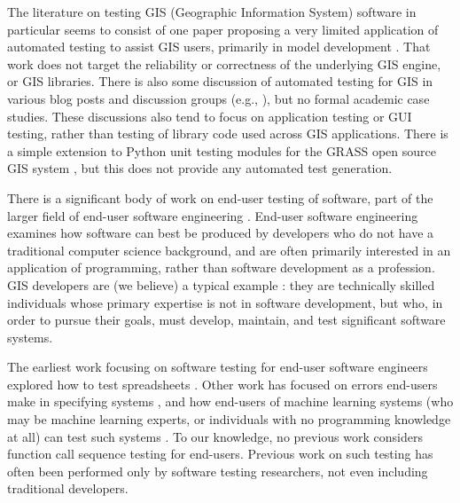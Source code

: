 The literature on testing GIS (Geographic Information System) software in particular seems to consist
of one paper proposing a very limited application of automated testing
to assist GIS users, primarily in model development \cite{GISTest}.
That work does not target the reliability or correctness of the
underlying GIS engine, or GIS libraries.  There is also some
discussion of automated testing for GIS in various blog posts and
discussion groups (e.g., \cite{gisblog1,gisblog2}), but no formal
academic case studies.  These discussions also tend to focus on
application testing or GUI testing, rather than testing of library
code used across GIS applications.  There is a simple extension to
Python unit testing modules for the GRASS open source GIS system
\cite{GRASSunit}, but this does not provide any automated test generation.

There is a significant body of work on end-user testing of software,
part of the larger field of end-user software engineering
\cite{burnettEUSE,Silos}.  End-user software engineering examines how
software can best be produced by developers who do not have a
traditional computer science background, and are often primarily
interested in an application of programming, rather than software
development as a profession.  GIS developers are (we believe) a
typical example \cite{Segal07}:  they are technically skilled  individuals whose
primary expertise is not in software development, but who, in order to
pursue their goals, must develop, maintain, and test significant
software systems.

The earliest work focusing on software testing for
end-user software engineers explored how to test spreadsheets
\cite{rothermelTOSEM,rothermel2000wysiwyt}.  Other work has focused on
errors end-users make in specifying systems \cite{Phalgune}, and how
end-users of machine learning systems (who may be machine learning
experts, or individuals with no programming knowledge at all) can test
such systems \cite{OnlyOracle,kulesza-eud11,shinsel-vlhcc}.  To our
knowledge, no previous work considers function call sequence testing for
end-users.  Previous work on such testing has often been performed
only by software testing researchers, not even including traditional developers.

